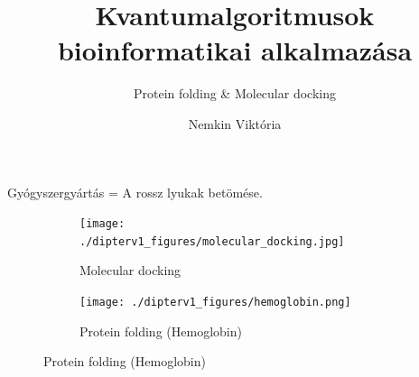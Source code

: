 \documentclass[aspectratio=169]{beamer}
\author[Nemkin Viktória, dr. Friedl Katalin]{Nemkin Viktória}
\institute[]{
\begin{small}Témavezető: dr. Friedl Katalin\end{small}
}
\title{Kvantumalgoritmusok bioinformatikai alkalmazása}
\subtitle{Protein folding \& Molecular docking}
\date{}
\begin{document}
\begin{frame}
\titlepage
\end{frame}

\begin{frame}{Gyógyszergyártás = A rossz lyukak betömése.}


\begin{figure}[H]
  \centering
  \begin{subfigure}{.48\linewidth}
    \centering
    \texttt{[image: ./dipterv1\_figures/molecular\_docking.jpg]}
    \caption{Molecular docking}
  \end{subfigure}
  \begin{subfigure}{.4\linewidth}
    \centering
    \texttt{[image: ./dipterv1\_figures/hemoglobin.png]}
    \caption{Protein folding (Hemoglobin)}
  \end{subfigure}
\end{figure}

\end{frame}
\end{document}

